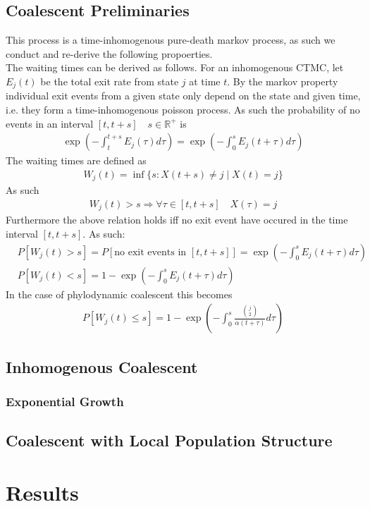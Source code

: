 \documentclass{report}
\newcommand{\R}{\mathbb{R}}
\theoremstyle{definition}
\begin{document}
\section{Coalescent Preliminaries}
This process is a time-inhomogenous pure-death markov process, as such we conduct and re-derive the following propoerties.\\
The waiting times can be derived as follows.
For an inhomogenous CTMC, let $E_j(t)$ be the total exit rate from state $j$ at time $t$.
By the markov property individual exit events from a given state only depend on the state and given time, i.e. they form a time-inhomogenous poisson process.
As such the probability of no events in an interval $[t,t+s]\quad s\in \R^+$ is 
\begin{gather}
\exp(-\int_t^{t+s}E_j(\tau)d\tau) = \exp(-\int_0^{s}E_j(t+\tau)d\tau)
\end{gather}
The waiting times are defined as
\begin{gather}
W_j(t) = \inf\{s:X(t+s)\neq j \mid X(t) = j\}
\end{gather}
As such
\begin{gather}
W_j(t) > s \Rightarrow \forall \tau\in[t, t+s]\quad X(\tau) = j
\end{gather}
Furthermore the above relation holds iff no exit event have occured in the time interval $[t,t+s]$. As such:
\begin{align*}
&P[W_j(t) > s] = P[\text{no exit events in }[t,t+s]] = \exp(-\int_0^{s}E_j(t+\tau)d\tau)\\
&P[W_j(t) < s] = 1 - \exp(-\int_0^{s}E_j(t+\tau)d\tau)
\end{align*}
In the case of phylodynamic coalescent this becomes
\begin{gather}
P[W_j(t) \leq s] = 1 - \exp(-\int_0^{s}\frac{\binom{j}{2}}{\alpha(t+\tau)}d\tau)
\end{gather}
\section{Inhomogenous Coalescent}
\subsection{Exponential Growth}
\section{Coalescent with Local Population Structure}
\chapter{Results}
\end{document}
